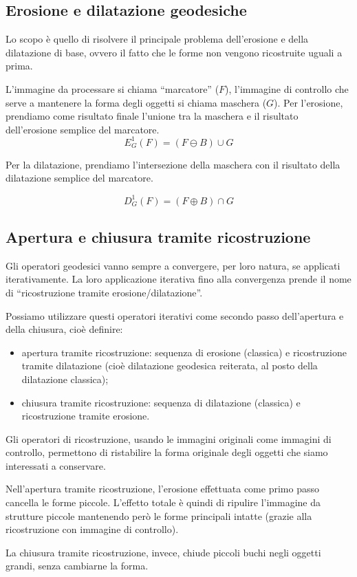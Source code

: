 \documentclass[a4paper,11pt]{article}
\begin{document}
\subsection{Erosione e dilatazione geodesiche}
Lo scopo è quello di risolvere il principale problema dell'erosione e della dilatazione di base, ovvero il fatto che le forme non vengono
ricostruite uguali a prima.
\par
L'immagine da processare si chiama ``marcatore'' ($F$), l'immagine di controllo che serve a mantenere la forma degli oggetti si chiama maschera ($G$).
Per l'erosione, prendiamo come risultato finale l'unione tra la maschera e il risultato dell'erosione semplice del marcatore.
\[
E^1_G(F)=(F \ominus B) \cup G
\]

Per la dilatazione, prendiamo l'intersezione della maschera con il risultato della dilatazione semplice del marcatore.

\[
D^1_G(F)=(F \oplus B) \cap G
\]

\subsection{Apertura e chiusura tramite ricostruzione}
Gli operatori geodesici vanno sempre a convergere, per loro natura, se applicati iterativamente. La loro applicazione iterativa fino alla convergenza
prende il nome di ``ricostruzione tramite erosione/dilatazione''.
\par
Possiamo utilizzare questi operatori iterativi come secondo passo dell'apertura e della chiusura, cioè definire:
\begin{itemize}
    \item apertura tramite ricostruzione: sequenza di erosione (classica) e ricostruzione tramite dilatazione (cioè dilatazione geodesica reiterata,
    al posto della dilatazione classica);
    \item chiusura tramite ricostruzione: sequenza di dilatazione (classica) e ricostruzione tramite erosione.
\end{itemize}
Gli operatori di ricostruzione, usando le immagini originali come immagini di controllo, permettono di ristabilire la forma originale
degli oggetti che siamo interessati a conservare.
\par
Nell'apertura tramite ricostruzione, l'erosione effettuata come primo passo cancella le forme piccole.
L'effetto totale è quindi di ripulire l'immagine da strutture piccole mantenendo però le forme principali intatte (grazie alla ricostruzione
con immagine di controllo).
\par
La chiusura tramite ricostruzione, invece, chiude piccoli buchi negli oggetti grandi, senza cambiarne la forma.
\end{document}
